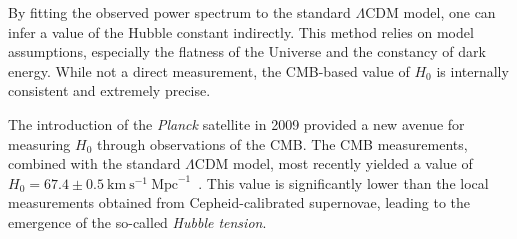 By fitting the observed power spectrum to the standard $\Lambda$CDM model, one can infer a value of the Hubble constant indirectly. This method relies on model assumptions, especially the flatness of the Universe and the constancy of dark energy. While not a direct measurement, the \ac{CMB}-based value of $H_0$ is internally consistent and extremely precise.

The introduction of the \textit{Planck} satellite in 2009 provided a new avenue for measuring $H_0$ through observations of the \ac{CMB}. The \ac{CMB} measurements, combined with the standard $\Lambda$CDM model, most recently yielded a value of $H_0 = 67.4 \pm 0.5~\mathrm{km}~\mathrm{s}^{-1}~\mathrm{Mpc}^{-1}$~\citep{Planck:2018vyg}. This value is significantly lower than the local measurements obtained from Cepheid-calibrated supernovae, leading to the emergence of the so-called \textit{Hubble tension}.

